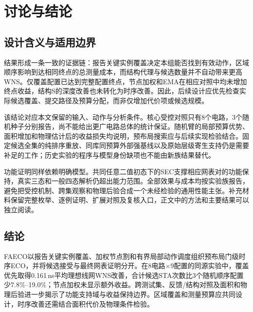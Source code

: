\documentclass[twocolumn,10pt,fontset=windows]{ctexart}
\begin{document}
\section{讨论与结论}

\subsection{设计含义与适用边界}

结果形成一条一致的证据链：报告关键实例覆盖决定本组能否找到有效动作，区域顺序影响到达相同终点的总测量成本，而结构代理与候选数量并不自动带来更高WNS。仅覆盖配置已达到完整配置终点，节点加权和EMA在相应对照中均未增加终点收益，结构S的深度改善也未转化为时序改善。因此，后续设计应优先检查实际候选覆盖、提交路径及预算分配，而非仅增加代价项或候选规模。

该结论对应本文保留的输入、动作与分析条件。核心受控对照只有8个电路，3个随机种子分别报告，尚不能给出更广电路总体的统计保证。随机臂的局部预算优势、面积增加和物理估计后的收益损失均说明，预布局搜索应与后续实现检验结合。固定候选全集的纯排序重放、同库同预算外部强基线以及原始层级寄生支持仍是需要补足的工作；历史实验的程序与模型身份缺项也不能由新族结果替代。

功能证明同样依赖明确模型。共同任意二值初态下的SEC支撑相应网表对的功能保持，真实三态和一般四态解析仍超出能力范围。全部效果与成本均按实验族报告，避免把受控机制、跨集观察和物理后验合成一个未经检验的通用性能主张。补充材料保留完整枚举、逐例证明、扩展对照及复核入口，正文中的方法和主要结果可以独立阅读。

\subsection{结论}

FAECO以报告关键实例覆盖、加权节点割和有界局部动作调度组织预布局门级时序ECO，并将候选接受与最终网表证明分开。在8电路$\times$9配置的同源实验中，覆盖优先取得0.161\,ns平均理想线网WNS改善，合计候选STA次数比3个随机顺序配置少7.8\%--19.0\%；节点加权未显示额外收益。跨测试集、反馈/结构对照及面积和物理后验进一步揭示了功能支持域与收益保持边界。区域覆盖和测量预算应共同设计，时序改善还需结合面积代价及物理条件检验。
\end{document}
